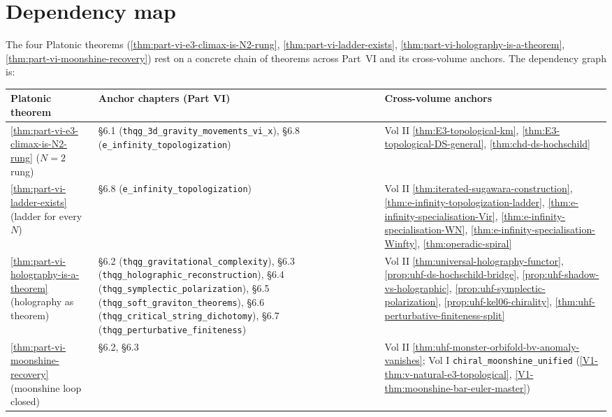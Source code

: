 \section{Dependency map}
\label{sec:part-vi-dependency-map}

The four Platonic theorems
(\ref{thm:part-vi-e3-climax-is-N2-rung},
\ref{thm:part-vi-ladder-exists},
\ref{thm:part-vi-holography-is-a-theorem},
\ref{thm:part-vi-moonshine-recovery}) rest on a concrete chain of
theorems across Part~VI and its cross-volume anchors. The
dependency graph is:

\begin{center}
\begin{tabular}{p{3.5cm}|p{6cm}|p{5cm}}
\hline
\textbf{Platonic theorem} & \textbf{Anchor chapters (Part VI)} &
\textbf{Cross-volume anchors} \\
\hline
\ref{thm:part-vi-e3-climax-is-N2-rung} ($N=2$ rung)
 & \S6.1 (\texttt{thqg\_3d\_gravity\_movements\_vi\_x}),
 \S6.8 (\texttt{e\_infinity\_topologization})
 & Vol II \ref{thm:E3-topological-km},
 \ref{thm:E3-topological-DS-general},
 \ref{thm:chd-ds-hochschild} \\
\hline
\ref{thm:part-vi-ladder-exists} (ladder for every $N$)
 & \S6.8 (\texttt{e\_infinity\_topologization})
 & Vol II \ref{thm:iterated-sugawara-construction},
 \ref{thm:e-infinity-topologization-ladder},
 \ref{thm:e-infinity-specialisation-Vir},
 \ref{thm:e-infinity-specialisation-WN},
 \ref{thm:e-infinity-specialisation-Winfty},
 \ref{thm:operadic-spiral} \\
\hline
\ref{thm:part-vi-holography-is-a-theorem} (holography as theorem)
 & \S6.2 (\texttt{thqg\_gravitational\_complexity}),
 \S6.3 (\texttt{thqg\_holographic\_reconstruction}),
 \S6.4 (\texttt{thqg\_symplectic\_polarization}),
 \S6.5 (\texttt{thqg\_soft\_graviton\_theorems}),
 \S6.6 (\texttt{thqg\_critical\_string\_dichotomy}),
 \S6.7 (\texttt{thqg\_perturbative\_finiteness})
 & Vol II \ref{thm:universal-holography-functor},
 \ref{prop:uhf-ds-hochschild-bridge},
 \ref{prop:uhf-shadow-vs-holographic},
 \ref{prop:uhf-symplectic-polarization},
 \ref{prop:uhf-kel06-chirality},
 \ref{thm:uhf-perturbative-finiteness-split} \\
\hline
\ref{thm:part-vi-moonshine-recovery} (moonshine loop closed)
 & \S6.2, \S6.3
 & Vol II \ref{thm:uhf-monster-orbifold-bv-anomaly-vanishes};
 Vol I \texttt{chiral\_moonshine\_unified}
 (\ref{V1-thm:v-natural-e3-topological},
 \ref{V1-thm:moonshine-bar-euler-master}) \\
\hline
\end{tabular}
\end{center}

